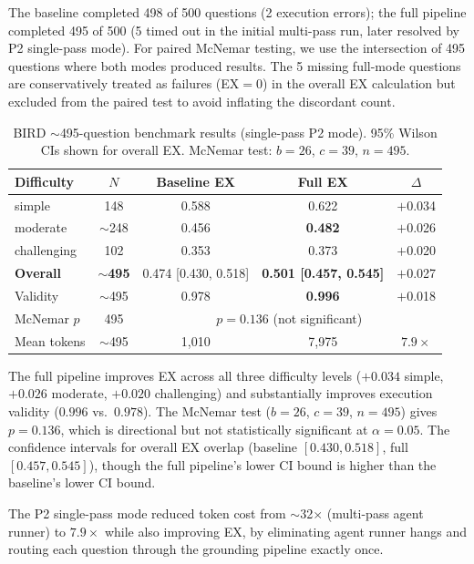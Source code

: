 \documentclass[11pt]{article}
\begin{document}
The baseline completed 498 of 500 questions (2 execution errors); the full pipeline completed 495 of 500 (5 timed out in the initial multi-pass run, later resolved by P2 single-pass mode). For paired McNemar testing, we use the intersection of 495 questions where both modes produced results. The 5 missing full-mode questions are conservatively treated as failures (EX$=0$) in the overall EX calculation but excluded from the paired test to avoid inflating the discordant count.

\begin{table}[t]
\centering
\caption{BIRD $\sim$495-question benchmark results (single-pass P2 mode). 95\% Wilson CIs shown for overall EX. McNemar test: $b=26$, $c=39$, $n=495$.}
\label{tab:bird}
\begin{tabular}{lcccc}
\toprule
Difficulty & $N$ & Baseline EX & Full EX & $\Delta$ \\
\midrule
simple        & 148  & 0.588 & 0.622 & $+$0.034 \\
moderate      & $\sim$248 & 0.456 & \textbf{0.482} & $+$0.026 \\
challenging   & 102  & 0.353 & 0.373 & $+$0.020 \\
\midrule
\textbf{Overall} & $\sim$\textbf{495} & 0.474 [0.430, 0.518] & \textbf{0.501 [0.457, 0.545]} & $+$0.027 \\
Validity     & $\sim$495 & 0.978 & \textbf{0.996} & $+$0.018 \\
\midrule
McNemar $p$  & 495 & \multicolumn{3}{c}{$p=0.136$ (not significant)} \\
Mean tokens  & $\sim$495 & 1{,}010 & 7{,}975 & $7.9\times$ \\
\bottomrule
\end{tabular}
\end{table}

The full pipeline improves EX across all three difficulty levels ($+0.034$ simple, $+0.026$ moderate, $+0.020$ challenging) and substantially improves execution validity ($0.996$ vs.\ $0.978$). The McNemar test ($b=26$, $c=39$, $n=495$) gives $p=0.136$, which is directional but not statistically significant at $\alpha=0.05$. The confidence intervals for overall EX overlap (baseline $[0.430, 0.518]$, full $[0.457, 0.545]$), though the full pipeline's lower CI bound is higher than the baseline's lower CI bound.

The P2 single-pass mode reduced token cost from $\sim$32$\times$ (multi-pass agent runner) to $7.9\times$ while also improving EX, by eliminating agent runner hangs and routing each question through the grounding pipeline exactly once.
\end{document}
